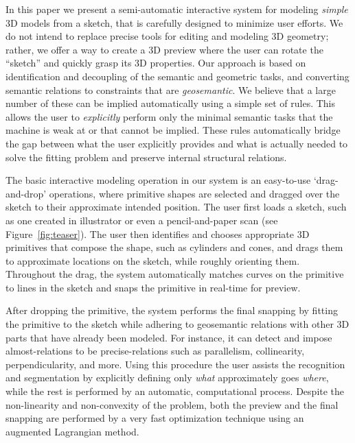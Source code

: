 In this paper we present a semi-automatic interactive system for modeling {\em simple} 3D models from a sketch, that is carefully designed to minimize user efforts. We do not intend to replace precise tools for editing and modeling 3D geometry; rather, we offer a way to create a 3D preview where the user can rotate the ``sketch'' and quickly grasp its 3D properties. Our approach is based on identification and decoupling of the semantic and geometric tasks, and converting semantic relations to constraints that are {\em geosemantic}. We believe that a large number of these can be implied automatically using a simple set of rules. This allows the user to \emph{explicitly} perform only the minimal semantic tasks that the machine is weak at or that cannot be implied.
These rules automatically bridge the gap between what the user explicitly provides and what is actually needed to solve the fitting problem and preserve internal structural relations.

The basic interactive modeling operation in our system is an easy-to-use `drag-and-drop' operations, where primitive shapes are selected and dragged over the sketch to their approximate intended position. The user first loads a sketch, such as one created in illustrator or even a pencil-and-paper scan (see Figure~\ref{fig:teaser}).
The user then identifies and chooses appropriate 3D primitives that compose the shape, such as cylinders and cones, and drags them to approximate locations on the sketch, while roughly orienting them. Throughout the drag, the system automatically matches curves on the primitive to lines in the sketch and snaps the primitive in real-time for preview.

After dropping the primitive, the system performs the final snapping by fitting the primitive to the sketch while adhering to geosemantic relations with other 3D parts that have already been modeled. For instance, it can detect and impose almost-relations to be precise-relations such as parallelism, collinearity, perpendicularity, and more.
Using this procedure the user assists the recognition and segmentation by explicitly defining only {\em what} approximately goes {\em where}, while the rest is performed by an automatic, computational process.
Despite the non-linearity and non-convexity of the problem, both the preview and the final snapping are performed by a very fast optimization technique using an augmented Lagrangian method.
